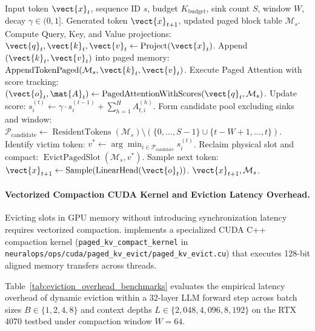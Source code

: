 \begin{algorithm}[t]
\caption[Online Heavy Hitter Oracle (H\_2O) with Attention Sinks \& Paged Block Evicti]{Online Heavy Hitter Oracle ($H_2O$) with Attention Sinks \& Paged Block Eviction}
\label{alg:h2o_paged_eviction}
\begin{algorithmic}[1]
\REQUIRE Input token $\vect{x}_t$, sequence ID $s$, budget $K_{\text{budget}}$, sink count $S$, window $W$, decay $\gamma \in (0, 1]$.
\ENSURE Generated token $\vect{x}_{t+1}$, updated paged block table $\mathcal{M}_s$.
\STATE Compute Query, Key, and Value projections: $\vect{q}_t, \vect{k}_t, \vect{v}_t \leftarrow \operatorname{Project}(\vect{x}_t)$.
\STATE Append $(\vect{k}_t, \vect{v}_t)$ into paged memory: $\operatorname{AppendTokenPaged}(\mathcal{M}_s, \vect{k}_t, \vect{v}_t)$.
\STATE Execute Paged Attention with score tracking: $(\vect{o}_t, \mat{A}_t) \leftarrow \operatorname{PagedAttentionWithScores}(\vect{q}_t, \mathcal{M}_s)$.
    \STATE Update score: $s_i^{(t)} \leftarrow \gamma \cdot s_i^{(t-1)} + \sum_{h=1}^H A_{t, i}^{(h)}$.
\ENDFOR
{}
    \STATE Form candidate pool excluding sinks and window:
    \STATE $\mathcal{P}_{\text{candidate}} \leftarrow \operatorname{ResidentTokens}(\mathcal{M}_s) \setminus \left( \{0, \dots, S-1\} \cup \{t - W + 1, \dots, t\} \right)$.
    \STATE Identify victim token: $v^* \leftarrow \arg\min_{i \in \mathcal{P}_{\text{candidate}}} s_i^{(t)}$.
    \STATE Reclaim physical slot and compact: $\operatorname{EvictPagedSlot}(\mathcal{M}_s, v^*)$.
\ENDIF
\STATE Sample next token: $\vect{x}_{t+1} \leftarrow \operatorname{Sample}(\operatorname{LinearHead}(\vect{o}_t))$.
\RETURN $\vect{x}_{t+1}, \mathcal{M}_s$.
\end{algorithmic}
\end{algorithm}

\paragraph{Vectorized Compaction CUDA Kernel and Eviction Latency Overhead.}
Evicting slots in GPU memory without introducing synchronization latency requires vectorized compaction. \neuralops{} implements a specialized CUDA C++ compaction kernel (\texttt{paged\_kv\_compact\_kernel} in \texttt{neuralops/ops/cuda/paged\_kv\_evict/paged\_kv\_evict.cu}) that executes 128-bit aligned memory transfers across threads.

Table~\ref{tab:eviction_overhead_benchmarks} evaluates the empirical latency overhead of dynamic eviction within a 32-layer LLM forward step across batch sizes $B \in \{1, 2, 4, 8\}$ and context depths $L \in \{2{,}048, 4{,}096, 8{,}192\}$ on the RTX 4070 testbed under compaction window $W=64$.

